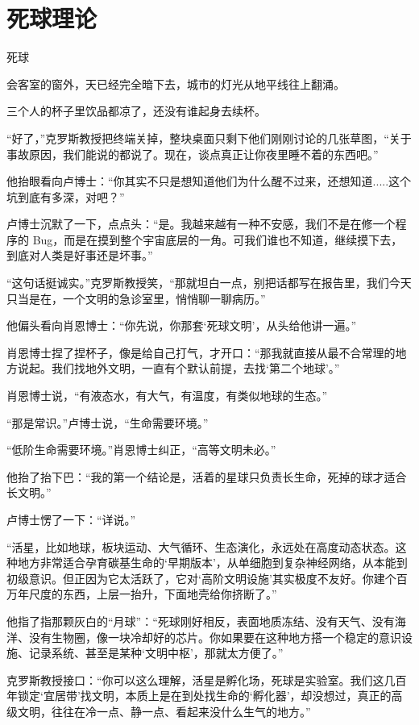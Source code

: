 \chapter{死球理论}

死球

会客室的窗外，天已经完全暗下去，城市的灯光从地平线往上翻涌。

三个人的杯子里饮品都凉了，还没有谁起身去续杯。

“好了，”克罗斯教授把终端关掉，整块桌面只剩下他们刚刚讨论的几张草图，“关于事故原因，我们能说的都说了。现在，谈点真正让你夜里睡不着的东西吧。”

他抬眼看向卢博士：“你其实不只是想知道他们为什么醒不过来，还想知道.....这个坑到底有多深，对吧？”

卢博士沉默了一下，点点头：“是。我越来越有一种不安感，我们不是在修一个程序的 Bug，而是在摸到整个宇宙底层的一角。可我们谁也不知道，继续摸下去，到底对人类是好事还是坏事。”

“这句话挺诚实。”克罗斯教授笑，“那就坦白一点，别把话都写在报告里，我们今天只当是在，一个文明的急诊室里，悄悄聊一聊病历。”

他偏头看向肖恩博士：“你先说，你那套‘死球文明’，从头给他讲一遍。”

肖恩博士捏了捏杯子，像是给自己打气，才开口：“那我就直接从最不合常理的地方说起。我们找地外文明，一直有个默认前提，去找‘第二个地球’。”

肖恩博士说，“有液态水，有大气，有温度，有类似地球的生态。”

“那是常识。”卢博士说，“生命需要环境。”

“低阶生命需要环境。”肖恩博士纠正，“高等文明未必。”

他抬了抬下巴：“我的第一个结论是，活着的星球只负责长生命，死掉的球才适合长文明。”

卢博士愣了一下：“详说。”

“活星，比如地球，板块运动、大气循环、生态演化，永远处在高度动态状态。这种地方非常适合孕育碳基生命的‘早期版本’，从单细胞到复杂神经网络，从本能到初级意识。但正因为它太活跃了，它对‘高阶文明设施’其实极度不友好。你建个百万年尺度的东西，上层一抬升，下面地壳给你挤断了。”

他指了指那颗灰白的“月球”：“死球刚好相反，表面地质冻结、没有天气、没有海洋、没有生物圈，像一块冷却好的芯片。你如果要在这种地方搭一个稳定的意识设施、记录系统、甚至是某种‘文明中枢’，那就太方便了。”

克罗斯教授接口：“你可以这么理解，活星是孵化场，死球是实验室。我们这几百年锁定‘宜居带’找文明，本质上是在到处找生命的‘孵化器’，却没想过，真正的高级文明，往往在冷一点、静一点、看起来没什么生气的地方。”

